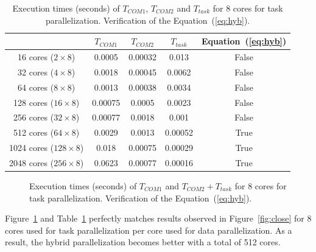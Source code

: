 \begin{table}[!h]
 \begin{center}
 \begin{tabular}{|c|c|c|c|c|}
    \hline 
    & $T_{COM1}$ & $T_{COM2}$ & $T_{task}$ & Equation~(\ref{eq:hyb})\\
   \hline
   16 cores ($2 \times 8$) & 0.0005 & 0.00032 & 0.013 & False\\
   32 cores ($4 \times 8$) & 0.0018 & 0.00045 & 0.0062 & False\\
   64 cores ($8 \times 8$) & 0.0013 & 0.00038 & 0.0034 & False\\
   128 cores ($16 \times 8$) & 0.00075 & 0.0005 & 0.0023 & False\\
   256 cores ($32 \times 8$) & 0.00077 & 0.0018 & 0.001 & False\\
   512 cores ($64 \times 8$) & 0.0029 & 0.0013 & 0.00052 & True\\
   1024 cores ($128 \times 8$) & 0.018 & 0.00075 & 0.00029 & True\\
   2048 cores ($256 \times 8$) & 0.0623 & 0.00077 & 0.00016 & True\\
   \hline
 \end{tabular}
\caption{Execution times (seconds) of $T_{COM1}$, $T_{COM2}$ and $T_{task}$ for 8 cores for task parallelization. Verification of the Equation~(\ref{eq:hyb}).}
\label{fig:tth}
 \end{center}
\end{table}

\begin{figure}[!h]\begin{center}
  \caption{Execution times (seconds) of $T_{COM1}$ and $T_{COM2} + T_{task}$ for 8 cores for task parallelization. Verification of the Equation~(\ref{eq:hyb}).}
  \label{fig:tth2}
\end{center}\end{figure}

Figure~\ref{fig:tth2} and Table~\ref{fig:tth} perfectly matches results observed in Figure~\ref{fig:close} for 8 cores used for task parallelization per core used for data parallelization. As a result, the hybrid parallelization becomes better with a total of 512 cores.
